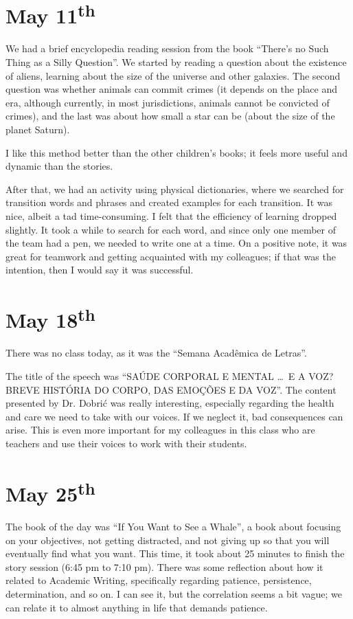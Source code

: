 \section[May 11th]{May 11\textsuperscript{th}}

We had a brief encyclopedia reading session from the book ``There's no Such Thing as a Silly Question''. We started by reading a question about the existence of aliens, learning about the size of the universe and other galaxies. The second question was whether animals can commit crimes (it depends on the place and era, although currently, in most jurisdictions, animals cannot be convicted of crimes), and the last was about how small a star can be (about the size of the planet Saturn).

I like this method better than the other children's books; it feels more useful and dynamic than the stories.

After that, we had an activity using physical dictionaries, where we searched for transition words and phrases and created examples for each transition. It was nice, albeit a tad time-consuming. I felt that the efficiency of learning dropped slightly. It took a while to search for each word, and since only one member of the team had a pen, we needed to write one at a time. On a positive note, it was great for teamwork and getting acquainted with my colleagues; if that was the intention, then I would say it was successful.

\section[May 18th]{May 18\textsuperscript{th}}

There was no class today, as it was the ``Semana Acadêmica de Letras''.

The title of the speech was ``SAÚDE CORPORAL E MENTAL \dots\ E A VOZ? BREVE HISTÓRIA DO CORPO, DAS EMOÇÕES E DA VOZ''. The content presented by Dr. Dobrić was really interesting, especially regarding the health and care we need to take with our voices. If we neglect it, bad consequences can arise. This is even more important for my colleagues in this class who are teachers and use their voices to work with their students.

\section[May 25th]{May 25\textsuperscript{th}}

The book of the day was ``If You Want to See a Whale'', a book about focusing on your objectives, not getting distracted, and not giving up so that you will eventually find what you want. This time, it took about 25 minutes to finish the story session (6:45 pm to 7:10 pm). There was some reflection about how it related to Academic Writing, specifically regarding patience, persistence, determination, and so on. I can see it, but the correlation seems a bit vague; we can relate it to almost anything in life that demands patience.


